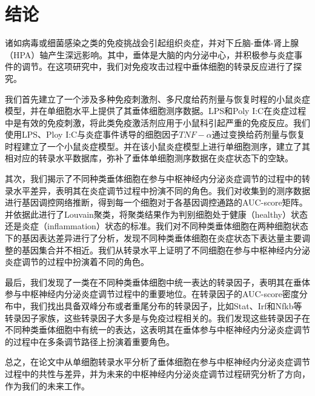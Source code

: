 
\chapter{结论}
  诸如病毒或细菌感染之类的免疫挑战会引起组织炎症，并对下丘脑­-垂体­-肾上腺（HPA）轴产生深远影响。其中，垂体是大脑的内分泌中心，并积极参与炎症事件的调节。在这项研究中，我们对免疫攻击过程中垂体细胞的转录反应进行了探究。

  我们首先建立了一个涉及多种免疫刺激剂、多尺度给药剂量与恢复时程的小鼠炎症模型，并在单细胞水平上提供了其垂体细胞测序数据。LPS和Poly I:C在炎症过程中是有效的免疫刺激，将此类免疫激活剂应用于小鼠科引起严重的免疫反应。我们使用LPS、Ploy I:C与炎症事件诱导的细胞因子$TNF-\alpha$通过变换给药剂量与恢复时程建立了一个小鼠炎症模型。并在该小鼠炎症模型上进行单细胞测序，建立了其相对应的转录水平数据库，弥补了垂体单细胞测序数据在炎症状态下的空缺。

  其次，我们揭示了不同种类垂体细胞在参与中枢神经内分泌炎症调节的过程中的转录水平差异，表明其在炎症调节过程中扮演不同的角色。我们对收集到的测序数据进行基因调控网络推断，得到每一个细胞对于各基因调控通路的AUC-score矩阵。并依据此进行了Louvain聚类，将聚类结果作为判别细胞处于健康（healthy）状态还是炎症（inflammation）状态的标准。我们对不同种类垂体细胞在两种细胞状态下的基因表达差异进行了分析，发现不同种类垂体细胞在炎症状态下表达量主要调整的基因集合并不相近。我们从转录水平上证明了不同细胞在参与中枢神经内分泌炎症调节的过程中扮演着不同的角色。

  最后，我们发现了一类在不同种类垂体细胞中统一表达的转录因子，表明其在垂体参与中枢神经内分泌炎症调节过程中的重要地位。在转录因子的AUC-score密度分布中，我们找出具备双峰分布或者重尾分布的转录因子，比如Stat、Irf和Nfkb等转录因子家族，这些转录因子大多是与免疫过程相关的。我们发现这些转录因子在不同种类垂体细胞中有统一的表达，这表明其在垂体参与中枢神经内分泌炎症调节的过程中在多条调节路径上扮演着重要角色。

  总之，在论文中从单细胞转录水平分析了垂体细胞在参与中枢神经内分泌炎症调节过程中的共性与差异，并为未来的中枢神经内分泌炎症调节过程研究分析了方向，作为我们的未来工作。

